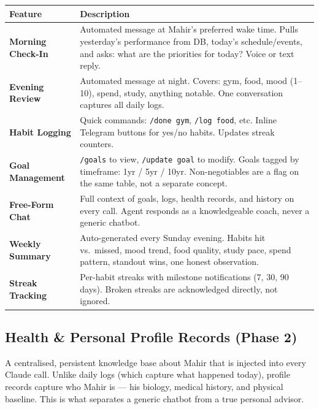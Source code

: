 \documentclass[12pt, a4paper]{article}
\begin{document}
\begin{longtable}{>{\bfseries}p{4cm} p{10cm}}
\toprule
Feature & Description \\
\midrule
Morning Check-In & Automated message at Mahir's preferred wake time. Pulls yesterday's performance from DB, today's schedule/events, and asks: what are the priorities for today? Voice or text reply. \\
\addlinespace
Evening Review & Automated message at night. Covers: gym, food, mood (1--10), spend, study, anything notable. One conversation captures all daily logs. \\
\addlinespace
Habit Logging & Quick commands: \texttt{/done gym}, \texttt{/log food}, etc. Inline Telegram buttons for yes/no habits. Updates streak counters. \\
\addlinespace
Goal Management & \texttt{/goals} to view, \texttt{/update goal} to modify. Goals tagged by timeframe: 1yr / 5yr / 10yr. Non-negotiables are a flag on the same table, not a separate concept. \\
\addlinespace
Free-Form Chat & Full context of goals, logs, health records, and history on every call. Agent responds as a knowledgeable coach, never a generic chatbot. \\
\addlinespace
Weekly Summary & Auto-generated every Sunday evening. Habits hit vs.\ missed, mood trend, food quality, study pace, spend pattern, standout wins, one honest observation. \\
\addlinespace
Streak Tracking & Per-habit streaks with milestone notifications (7, 30, 90 days). Broken streaks are acknowledged directly, not ignored. \\
\bottomrule
\end{longtable}

\subsection{Health \& Personal Profile Records (Phase 2)}

A centralised, persistent knowledge base about Mahir that is injected into every Claude call. Unlike daily logs (which capture what happened today), profile records capture who Mahir is --- his biology, medical history, and physical baseline. This is what separates a generic chatbot from a true personal advisor.
\end{document}
